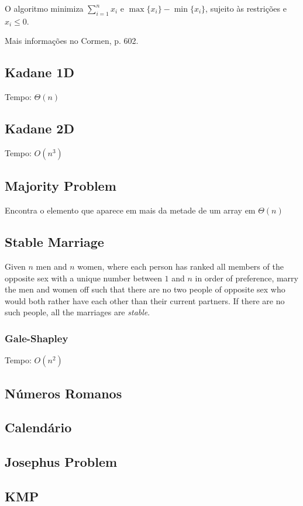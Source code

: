 \documentclass[12pt,a4paper]{article}
\begin{document}
			O algoritmo minimiza $\sum_{i=1}^n x_i$ e $\max\{x_i\} - \min\{x_i\}$, sujeito às restrições e $x_i \leq 0$.

			Mais informações no Cormen, p. 602.
		\subsection{Kadane 1D}
			Tempo: \(\Theta(n)\)
			
		\subsection{Kadane 2D}
			Tempo: \(O(n^3)\)
			
		\subsection{Majority Problem}
			Encontra o elemento que aparece em mais da metade de um array em \(\Theta(n)\)
			
		\subsection{Stable Marriage}
			Given $n$ men and $n$ women, where each person has ranked all members of the opposite sex with a unique number between $1$ and $n$ in order of preference, marry the men and women off such that there are no two people of opposite sex who would both rather have each other than their current partners. If there are no such people, all the marriages are \emph{stable}.
			\subsubsection{Gale-Shapley}
				Tempo: \(O(n^2)\)
				
		\subsection{Números Romanos}
			
		\subsection{Calendário}
			
		\subsection{Josephus Problem}
			
		\subsection{KMP}
			
\end{document}
